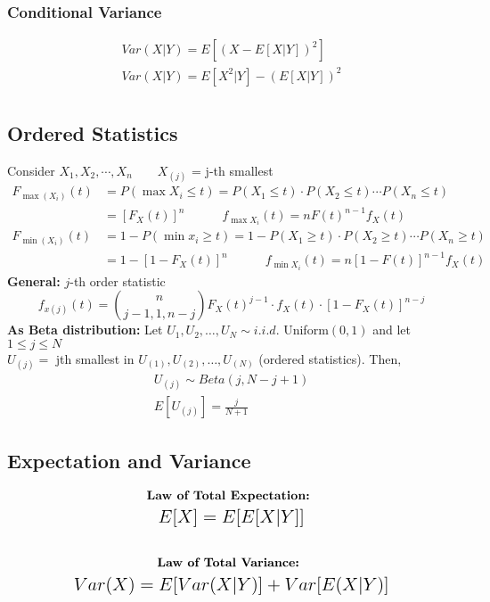\subsubsection*{Conditional Variance}
\begin{gather*}
	\boxed{Var(X|Y) = E[(X - E[X|Y])^2]} \tag{conditional variance}\\
	\boxed{Var(X|Y) = E[X^2|Y] - (E[X|Y])^2} \tag{unconditional variance}\\
\end{gather*}
\subsection*{Ordered Statistics}
Consider $X_1, X_2, \cdots, X_n \quad \quad X_{(j)}$ = j-th smallest
\begin{align*}
	F_{\max(X_i)}(t) & = P(\max X_i \leq t) = P(X_1 \leq t)\cdot P(X_2 \leq t) \cdots P(X_n \leq t)\\
	& = [F_X(t)]^n \quad \quad \quad
	\boxed{f_{\max X_i}(t) = nF(t)^{n-1} f_X(t)}\\
	 F_{\min(X_i)}(t) & = 1 - P(\min x_i \geq t) = 1-P(X_1 \geq t)\cdot P(X_2 \geq t) \cdots P(X_n \geq t)\\
	 & = 1 - [1 - F_X(t)]^n \quad \quad \quad \boxed{f_{\min X_i}(t) = n[1 - F(t)]^{n-1} f_X(t)}
\end{align*}
\textbf{General:} $j$-th order statistic
\begin{equation*}
	f_{x(j)}(t) = \binom{n}{j-1,1,n-j} F_X(t)^{j-1}\cdot f_X(t) \cdot [1-F_X(t)]^{n-j}
\end{equation*}
\textbf{As Beta distribution: }
Let $U_1, U_2, \ldots, U_N \sim i.i.d.$ Uniform$(0,1)$ and let $1 \leq j \leq N$\\
$U_{(j)} = $ jth smallest in $U_{(1)}, U_{(2)}, \ldots, U_{(N)}$ (ordered statistics). Then,
\begin{gather*}
	U_{(j)} \sim Beta(j, N - j + 1)\\
	E[U_{(j)}] = \frac{j}{N+1}
\end{gather*}
\subsection*{Expectation and Variance}
\begin{gather*}
	\textbf{Law of Total Expectation: }\\ \mathlarger{\mathlarger{E[X] = E[E[X|Y]]}}\\\\
\textbf{Law of Total Variance: }\\ \mathlarger{\mathlarger{Var(X) = E[Var(X|Y)] + Var[E(X|Y)]}}
\end{gather*}

